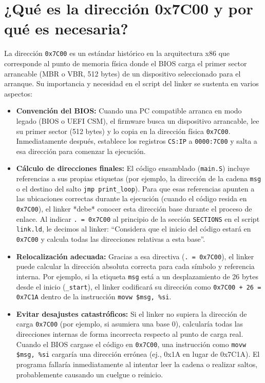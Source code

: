 \section{¿Qué es la dirección 0x7C00 y por qué es necesaria?}

La dirección \texttt{0x7C00} es un estándar histórico en la arquitectura x86 que corresponde al punto de memoria física donde el BIOS carga el primer sector arrancable (MBR o VBR, 512 bytes) de un dispositivo seleccionado para el arranque. Su importancia y necesidad en el script del linker se sustenta en varios aspectos:

\begin{itemize}[noitemsep]
  \item \textbf{Convención del BIOS:} Cuando una PC compatible arranca en modo legado (BIOS o UEFI CSM), el firmware busca un dispositivo arrancable, lee su primer sector (512 bytes) y lo copia en la dirección física \texttt{0x7C00}. Inmediatamente después, establece los registros \texttt{CS:IP} a \texttt{0000:7C00} y salta a esa dirección para comenzar la ejecución.

  \item \textbf{Cálculo de direcciones finales:} El código ensamblado (\texttt{main.S}) incluye referencias a sus propias etiquetas (por ejemplo, la dirección de la cadena \texttt{msg} o el destino del salto \texttt{jmp print\_loop}). Para que esas referencias apunten a las ubicaciones correctas durante la ejecución (cuando el código resida en \texttt{0x7C00}), el linker *debe* conocer esta dirección base durante el proceso de enlace. Al indicar \texttt{. = 0x7C00} al principio de la sección \texttt{SECTIONS} en el script \texttt{link.ld}, le decimos al linker: “Considera que el inicio del código estará en \texttt{0x7C00} y calcula todas las direcciones relativas a esta base”.

  \item \textbf{Relocalización adecuada:} Gracias a esa directiva (\texttt{. = 0x7C00}), el linker puede calcular la dirección absoluta correcta para cada símbolo y referencia interna. Por ejemplo, si la etiqueta \texttt{msg} está a un desplazamiento de 26 bytes desde el inicio (\texttt{\_start}), el linker codificará su dirección como \texttt{0x7C00 + 26 = 0x7C1A} dentro de la instrucción \texttt{movw \$msg, \%si}.

  \item \textbf{Evitar desajustes catastróficos:} Si el linker no supiera la dirección de carga \texttt{0x7C00} (por ejemplo, si asumiera una base 0), calcularía todas las direcciones internas de forma incorrecta respecto al punto de carga real. Cuando el BIOS cargase el código en \texttt{0x7C00}, una instrucción como \texttt{movw \$msg, \%si} cargaría una dirección errónea (ej., 0x1A en lugar de 0x7C1A). El programa fallaría inmediatamente al intentar leer la cadena o realizar saltos, probablemente causando un cuelgue o reinicio.
\end{itemize}

